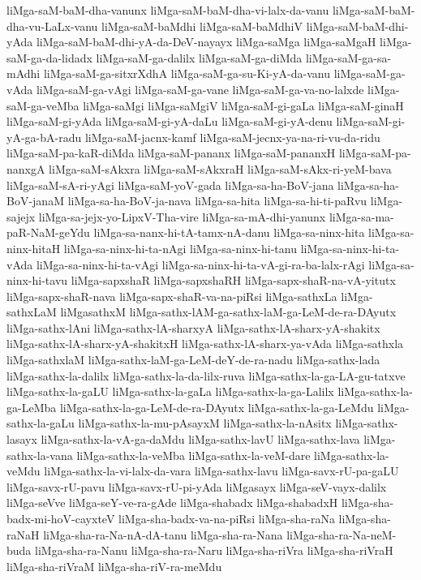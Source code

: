 {liMga-saM-baM-dha-vanunx
liMga-saM-baM-dha-vi-lalx-da-vanu
liMga-saM-baM-dha-vu-LaLx-vanu
liMga-saM-baMdhi
liMga-saM-baMdhiV
liMga-saM-baM-dhi-yAda
liMga-saM-baM-dhi-yA-da-DeV-nayayx
liMga-saMga
liMga-saMgaH
liMga-saM-ga-da-lidadx
liMga-saM-ga-dalilx
liMga-saM-ga-diMda
liMga-saM-ga-sa-mAdhi
liMga-saM-ga-sitxrXdhA
liMga-saM-ga-su-Ki-yA-da-vanu
liMga-saM-ga-vAda
liMga-saM-ga-vAgi
liMga-saM-ga-vane
liMga-saM-ga-va-no-lalxde
liMga-saM-ga-veMba
liMga-saMgi
liMga-saMgiV
liMga-saM-gi-gaLa
liMga-saM-ginaH
liMga-saM-gi-yAda
liMga-saM-gi-yA-daLu
liMga-saM-gi-yA-denu
liMga-saM-gi-yA-ga-bA-radu
liMga-saM-jacnx-kamf
liMga-saM-jecnx-ya-na-ri-vu-da-ridu
liMga-saM-pa-kaR-diMda
liMga-saM-pananx
liMga-saM-pananxH
liMga-saM-pa-nanxgA
liMga-saM-sAkxra
liMga-saM-sAkxraH
liMga-saM-sAkx-ri-yeM-bava
liMga-saM-sA-ri-yAgi
liMga-saM-yoV-gada
liMga-sa-ha-BoV-jana
liMga-sa-ha-BoV-janaM
liMga-sa-ha-BoV-ja-nava
liMga-sa-hita
liMga-sa-hi-ti-paRvu
liMga-sajejx
liMga-sa-jejx-yo-LipxV-Tha-vire
liMga-sa-mA-dhi-yanunx
liMga-sa-ma-paR-NaM-geYdu
liMga-sa-nanx-hi-tA-tamx-nA-danu
liMga-sa-ninx-hita
liMga-sa-ninx-hitaH
liMga-sa-ninx-hi-ta-nAgi
liMga-sa-ninx-hi-tanu
liMga-sa-ninx-hi-ta-vAda
liMga-sa-ninx-hi-ta-vAgi
liMga-sa-ninx-hi-ta-vA-gi-ra-ba-lalx-rAgi
liMga-sa-ninx-hi-tavu
liMga-sapxshaR
liMga-sapxshaRH
liMga-sapx-shaR-na-vA-yitutx
liMga-sapx-shaR-nava
liMga-sapx-shaR-va-na-piRsi
liMga-sathxLa
liMga-sathxLaM
liMgasathxM
liMga-sathx-lAM-ga-sathx-laM-ga-LeM-de-ra-DAyutx
liMga-sathx-lAni
liMga-sathx-lA-sharxyA
liMga-sathx-lA-sharx-yA-shakitx
liMga-sathx-lA-sharx-yA-shakitxH
liMga-sathx-lA-sharx-ya-vAda
liMga-sathxla
liMga-sathxlaM
liMga-sathx-laM-ga-LeM-deY-de-ra-nadu
liMga-sathx-lada
liMga-sathx-la-dalilx
liMga-sathx-la-da-lilx-ruva
liMga-sathx-la-ga-LA-gu-tatxve
liMga-sathx-la-gaLU
liMga-sathx-la-gaLa
liMga-sathx-la-ga-Lalilx
liMga-sathx-la-ga-LeMba
liMga-sathx-la-ga-LeM-de-ra-DAyutx
liMga-sathx-la-ga-LeMdu
liMga-sathx-la-gaLu
liMga-sathx-la-mu-pAsayxM
liMga-sathx-la-nAsitx
liMga-sathx-lasayx
liMga-sathx-la-vA-ga-daMdu
liMga-sathx-lavU
liMga-sathx-lava
liMga-sathx-la-vana
liMga-sathx-la-veMba
liMga-sathx-la-veM-dare
liMga-sathx-la-veMdu
liMga-sathx-la-vi-lalx-da-vara
liMga-sathx-lavu
liMga-savx-rU-pa-gaLU
liMga-savx-rU-pavu
liMga-savx-rU-pi-yAda
liMgasayx
liMga-seV-vayx-dalilx
liMga-seVve
liMga-seY-ve-ra-gAde
liMga-shabadx
liMga-shabadxH
liMga-sha-badx-mi-hoV-cayxteV
liMga-sha-badx-va-na-piRsi
liMga-sha-raNa
liMga-sha-raNaH
liMga-sha-ra-Na-nA-dA-tanu
liMga-sha-ra-Nana
liMga-sha-ra-Na-neM-buda
liMga-sha-ra-Nanu
liMga-sha-ra-Naru
liMga-sha-riVra
liMga-sha-riVraH
liMga-sha-riVraM
liMga-sha-riV-ra-meMdu
}
